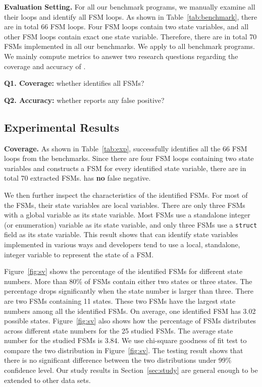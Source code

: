 \noindent\textbf{Evaluation Setting.}
For all our benchmark programs, we manually examine all their loops and
identify all FSM loops.
As shown in Table~\ref{tab:benchmark}, there are in
total 66 FSM loops.
Four FSM loops contain two state variables,
and all other FSM loops contain exact one state variable.
Therefore, there are in total 70 FSMs implemented in all our benchmarks.
We apply \Tool{} to all benchmark programs.
We mainly compute metrics to answer two research
questions regarding the coverage and accuracy of \Tool{}.

\noindent\textbf{Q1. Coverage:} whether \Tool{} identifies all FSMs?

\noindent\textbf{Q2. Accuracy:} whether \Tool{} reports any false positive?

\subsection{Experimental Results}
\label{sec:results}



\noindent\textbf{Coverage.}
As shown in Table~\ref{tab:exp}, \Tool{} successfully identifies
all the 66 FSM loops
from the benchmarks. Since there are four FSM loops containing
two state variables and \Tool{} constructs a FSM for every identified state variable,
there are in total 70 extracted FSMs.
\Tool{} has \textbf{no} false negative.

We then further inspect the characteristics of the identified FSMs.
For most of the FSMs, their state variables are local variables.
There are only three FSMs with a global variable as its state variable.
Most FSMs use a standalone integer (or enumeration) variable as its state variable,
and only three FSMs use a \texttt{struct} field as its state variable.
This result shows that \Tool{} can identify state variables implemented in various ways
and developers tend to use a local, standalone, integer variable to
represent the state of a FSM.




Figure~\ref{fig:sv} shows the percentage of the identified FSMs
for different state numbers.
More than 80\% of FSMs contain either two states or three states.
The percentage drops significantly when the state number is larger than three.
There are two FSMs containing 11 states.
These two FSMs have the largest state numbers among all the identified FSMs.
On average, one identified FSM has 3.02 possible states.
Figure~\ref{fig:sv} also shows how the percentage of FSMs distributes
across different state numbers
for the 25 studied FSMs.
The average state number for the studied FSMs is 3.84.
We use chi-square goodness of fit test to compare
the two distribution in Figure~\ref{fig:sv}.
The testing result shows that there is no significant
difference between the two distributions
under 99\% confidence level.
Our study results in Section~\ref{sec:study} are general enough to be
extended to other data sets.

